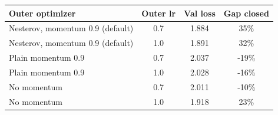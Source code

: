 \begin{tabular}{lccc}
\toprule
Outer optimizer & Outer lr & Val loss & Gap closed \\
\midrule
Nesterov, momentum 0.9 (default) & 0.7 & 1.884 & 35\% \\
Nesterov, momentum 0.9 (default) & 1.0 & 1.891 & 32\% \\
Plain momentum 0.9 & 0.7 & 2.037 & -19\% \\
Plain momentum 0.9 & 1.0 & 2.028 & -16\% \\
No momentum & 0.7 & 2.011 & -10\% \\
No momentum & 1.0 & 1.918 & 23\% \\
\bottomrule
\end{tabular}
